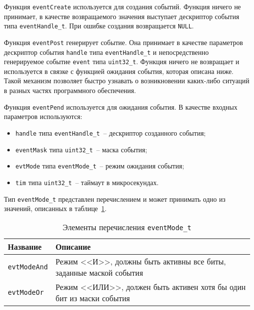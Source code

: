Функция \lstinline{eventCreate} используется для создания событий. Функция ничего не принимает, в качестве возвращаемого значения выступает дескриптор события типа \lstinline{eventHandle_t}. При ошибке создания возвращается \lstinline{NULL}.

Функция \lstinline{eventPost} генерирует событие. Она принимает в качестве параметров дескриптор события \lstinline{handle} типа \lstinline{eventHandle_t} и непосредственно
генерируемое событие \lstinline{event} типа \lstinline{uint32_t}. Функция ничего не возвращает и используется в связке с функцией ожидания события, которая описана ниже. Такой
механизм позволяет быстро узнавать о возникновении каких-либо ситуаций в разных частях программного обеспечения.

Функция \lstinline{eventPend} используется для ожидания события. В качестве входных параметров используются:

\begin{itemize}
    \item \lstinline{handle} типа \lstinline{eventHandle_t}~-- дескриптор созданного события;
    \item \lstinline{eventMask} типа \lstinline{uint32_t}~-- маска события;
    \item \lstinline{evtMode} типа \lstinline{eventMode_t}~-- режим ожидания события;
    \item \lstinline{tim} типа \lstinline{uint32_t}~-- таймаут в микросекундах.
\end{itemize}

Тип \lstinline{eventMode_t} представлен перечислением и может принимать одно из значений, описанных в таблице~\ref{table:func:eventMode}.

\begin{table}[ht]
    \caption{Элементы перечисления \lstinline{eventMode_t}}
    \label{table:func:eventMode}
    \begin{tabular}{| >{\raggedright}m{}
                    | >{\raggedright\arraybackslash}m{}|}
        \hline
        \centering Название & \centering\arraybackslash Описание \\

        \hline
        \lstinline[]$evtModeAnd$ &
        Режим <<И>>, должны быть активны все биты, заданные маской события
        \\

        \hline
        \lstinline[]$evtModeOr$ &
        Режим <<ИЛИ>>, должен быть активен хотя бы один бит из маски события
        \\

        \hline
    \end{tabular}
\end{table}

